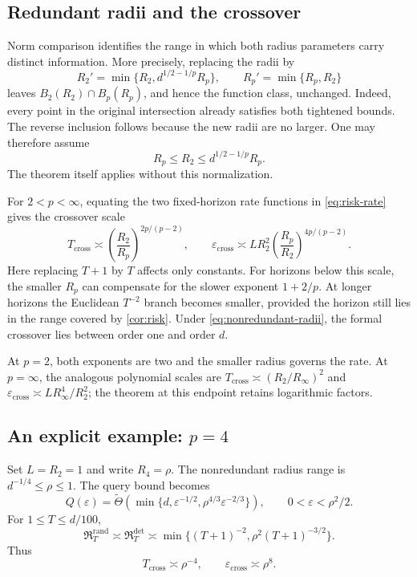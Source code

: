 \documentclass[11pt]{article}
\newcommand{\Risk}{\mathfrak{R}}
\newcommand{\softTh}{\widetilde{\Theta}}
\newcommand{\eps}{\varepsilon}
\theoremstyle{definition}
\theoremstyle{remark}
\begin{document}
\subsection{Redundant radii and the crossover}

Norm comparison identifies the range in which both radius parameters
carry distinct information. More precisely, replacing the radii by
\begin{equation}
\label{eq:canonical-radii}
 R_2'=\min\{R_2,d^{1/2-1/p}R_p\},\qquad
 R_p'=\min\{R_p,R_2\}
\end{equation}
leaves $B_2(R_2)\cap B_p(R_p)$, and hence the function class, unchanged.
Indeed, every point in the original intersection already satisfies
both tightened bounds. The reverse inclusion follows because the
new radii are no larger. One may therefore assume
\begin{equation}
\label{eq:nonredundant-radii}
 R_p\le R_2\le d^{1/2-1/p}R_p.
\end{equation}
The theorem itself applies without this normalization.

For $2<p<\infty$, equating the two fixed-horizon rate functions in
\cref{eq:risk-rate} gives the crossover scale
\begin{equation}
\label{eq:general-crossover}
 T_{\mathrm{cross}}\asymp
 \left(\frac{R_2}{R_p}\right)^{2p/(p-2)},\qquad
 \eps_{\mathrm{cross}}\asymp
 LR_2^2\left(\frac{R_p}{R_2}\right)^{4p/(p-2)}.
\end{equation}
Here replacing $T+1$ by $T$ affects only constants. For horizons below
this scale, the smaller $R_p$ can compensate for the slower exponent
$1+2/p$. At longer horizons the Euclidean $T^{-2}$ branch becomes
smaller, provided the horizon still lies in the range covered by
\cref{cor:risk}. Under \cref{eq:nonredundant-radii}, the formal crossover
lies between order one and order $d$.

At $p=2$, both exponents are two and the smaller radius governs the
rate. At $p=\infty$, the analogous polynomial scales are
$T_{\mathrm{cross}}\asymp(R_2/R_\infty)^2$ and
$\eps_{\mathrm{cross}}\asymp LR_\infty^4/R_2^2$;
the theorem at this endpoint retains logarithmic factors.

\subsection{An explicit example: \texorpdfstring{$p=4$}{p=4}}

Set $L=R_2=1$ and write $R_4=\rho$. The nonredundant radius range is
$d^{-1/4}\le\rho\le1$. The query bound becomes
\begin{equation}
\label{eq:p4-query}
 Q(\eps)=\softTh\!\left(
 \min\{d,\eps^{-1/2},\rho^{4/3}\eps^{-2/3}\}\right),
 \qquad 0<\eps<\rho^2/2.
\end{equation}
For $1\le T\le d/100$,
\begin{equation}
\label{eq:p4-risk}
 \Risk_T^{\mathrm{rand}}\asymp\Risk_T^{\mathrm{det}}
 \asymp\min\{(T+1)^{-2},\rho^2(T+1)^{-3/2}\}.
\end{equation}
Thus
\begin{equation}
\label{eq:p4-crossover}
 T_{\mathrm{cross}}\asymp\rho^{-4},\qquad
 \eps_{\mathrm{cross}}\asymp\rho^8.
\end{equation}
\end{document}
